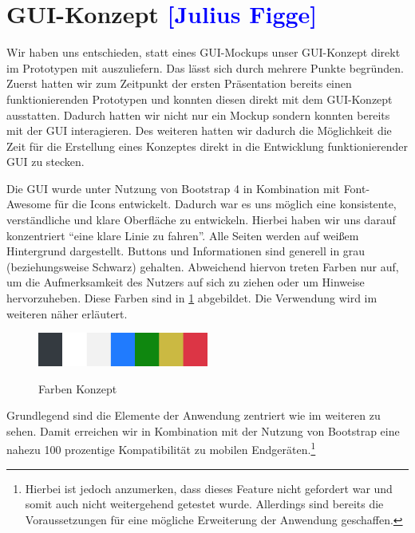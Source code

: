 

\section{GUI-Konzept \textcolor{blue}{[Julius Figge]}}

Wir haben uns entschieden, statt eines GUI-Mockups unser GUI-Konzept direkt im Prototypen mit auszuliefern.
Das lässt sich durch mehrere Punkte begründen.
Zuerst hatten wir zum Zeitpunkt der ersten Präsentation bereits einen funktionierenden Prototypen und konnten diesen direkt mit dem GUI-Konzept ausstatten. Dadurch hatten wir nicht nur ein Mockup sondern konnten bereits mit der GUI interagieren.
Des weiteren hatten wir dadurch die Möglichkeit die Zeit für die Erstellung eines Konzeptes direkt in die Entwicklung funktionierender GUI zu stecken.

Die GUI wurde unter Nutzung von Bootstrap 4 in Kombination mit Font-Awesome für die Icons entwickelt.
Dadurch war es uns möglich eine konsistente, verständliche und klare Oberfläche zu entwickeln.
Hierbei haben wir uns darauf konzentriert \enquote{eine klare Linie zu fahren}. Alle Seiten werden auf weißem Hintergrund dargestellt. Buttons und Informationen sind generell in grau (beziehungsweise Schwarz) gehalten.
Abweichend hiervon treten Farben nur auf, um die Aufmerksamkeit des Nutzers auf sich zu ziehen oder um Hinweise hervorzuheben. Diese Farben sind in \cref{fig:farbmuster} abgebildet. Die Verwendung wird im weiteren näher erläutert.

\begin{figure}[hbt]
    \centering
    \begin{minipage}[t]{1\textwidth}
        \caption{Farben Konzept}
        \includegraphics[width=0.5\textwidth]{img/Farbmuster.png}\\
        \label{fig:farbmuster}
    \end{minipage}
\end{figure}


Grundlegend sind die Elemente der Anwendung zentriert wie im weiteren zu sehen. Damit erreichen wir in Kombination mit der Nutzung von Bootstrap eine nahezu 100 prozentige Kompatibilität zu mobilen Endgeräten.\footnote{Hierbei ist jedoch anzumerken, dass dieses Feature nicht gefordert war und somit auch nicht weitergehend getestet wurde. Allerdings sind bereits die Voraussetzungen für eine mögliche Erweiterung der Anwendung geschaffen.}


